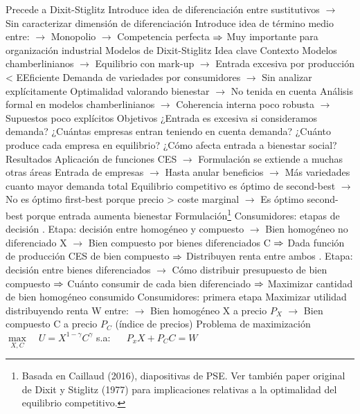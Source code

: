 \documentclass{nuevotema}
\begin{document}
\begin{esquemal}
				\4[] Precede a Dixit-Stiglitz
				\4[] Introduce idea de diferenciación entre sustitutivos
				\4[] $\to$ Sin caracterizar dimensión de diferenciación
				\4[] Introduce idea de término medio entre:
				\4[] $\to$ Monopolio
				\4[] $\to$ Competencia perfecta
				\4[] $\Rightarrow$ Muy importante para organización industrial
		\2 Modelos de Dixit-Stiglitz
			\3 Idea clave
				\4 Contexto
				\4[] Modelos chamberlinianos
				\4[] $\to$ Equilibrio con mark-up
				\4[] $\to$ Entrada excesiva por producción < EEficiente
				\4[] Demanda de variedades por consumidores
				\4[] $\to$ Sin analizar explícitamente
				\4[] Optimalidad valorando bienestar
				\4[] $\to$ No tenida en cuenta
				\4[] Análisis formal en modelos chamberlinianos
				\4[] $\to$ Coherencia interna poco robusta
				\4[] $\to$ Supuestos poco explícitos
				\4 Objetivos
				\4[] ¿Entrada es excesiva si consideramos demanda?
				\4[] ¿Cuántas empresas entran teniendo en cuenta demanda?
				\4[] ¿Cuánto produce cada empresa en equilibrio?
				\4[] ¿Cómo afecta entrada a bienestar social?
				\4 Resultados
				\4[] Aplicación de funciones CES
				\4[] $\to$ Formulación se extiende a muchas otras áreas
				\4[] Entrada de empresas
				\4[] $\to$ Hasta anular beneficios
				\4[] $\to$ Más variedades cuanto mayor demanda total
				\4[] Equilibrio competitivo es óptimo de second-best
				\4[] $\to$ No es óptimo first-best porque precio > coste marginal
				\4[] $\to$ Es óptimo second-best porque entrada aumenta bienestar
			\3 Formulación\footnote{Basada en Caillaud (2016), diapositivas de PSE. Ver también paper original de Dixit y Stiglitz (1977) para implicaciones relativas a la optimalidad del equilibrio competitivo.}
				\4 Consumidores: etapas de decisión
				. Etapa: decisión entre homogéneo y compuesto
				\4[] $\to$ Bien homogéneo no diferenciado X
				\4[] $\to$ Bien compuesto por bienes diferenciados C
				\4[] $\Rightarrow$ Dada función de producción CES de bien compuesto
				\4[] $\Rightarrow$ Distribuyen renta entre ambos
				. Etapa: decisión entre bienes diferenciados
				\4[] $\to$ Cómo distribuir presupuesto de bien compuesto
				\4[] $\Rightarrow$ Cuánto consumir de cada bien diferenciado
				\4[] $\Rightarrow$ Maximizar cantidad de bien homogéneo consumido
				\4 Consumidores: primera etapa
				\4[] Maximizar utilidad distribuyendo renta W entre:
				\4[] $\to$ Bien homogéneo X a precio $P_X$
				\4[] $\to$ Bien compuesto C a precio $P_C$ (índice de precios)
				\4[] Problema de maximización
				\4[] $\underset{X, C}{\max} \quad U = X^{1-\gamma} C^\gamma$
				\4[] s.a: $\quad$ $P_x X + P_C C = W$

\end{esquemal}
\end{document}
